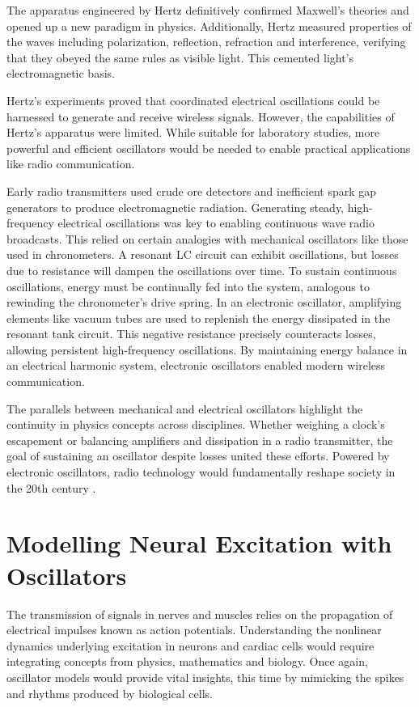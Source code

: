 The apparatus engineered by Hertz definitively confirmed Maxwell's theories and opened up a new paradigm in physics. Additionally, Hertz measured properties of the waves including polarization, reflection, refraction and interference, verifying that they obeyed the same rules as visible light. This cemented light's electromagnetic basis.

Hertz's experiments proved that coordinated electrical oscillations could be harnessed to generate and receive wireless signals. However, the capabilities of Hertz's apparatus were limited. While suitable for laboratory studies, more powerful and efficient oscillators would be needed to enable practical applications like radio communication.

Early radio transmitters used crude ore detectors and inefficient spark gap generators to produce electromagnetic radiation. Generating steady, high-frequency electrical oscillations was key to enabling continuous wave radio broadcasts. This relied on certain analogies with mechanical oscillators like those used in chronometers. A resonant LC circuit can exhibit oscillations, but losses due to resistance will dampen the oscillations over time. To sustain continuous oscillations, energy must be continually fed into the system, analogous to rewinding the chronometer's drive spring. In an electronic oscillator, amplifying elements like vacuum tubes are used to replenish the energy dissipated in the resonant tank circuit. This negative resistance precisely counteracts losses, allowing persistent high-frequency oscillations. By maintaining energy balance in an electrical harmonic system, electronic oscillators enabled modern wireless communication.

The parallels between mechanical and electrical oscillators highlight the continuity in physics concepts across disciplines. Whether weighing a clock's escapement or balancing amplifiers and dissipation in a radio transmitter, the goal of sustaining an oscillator despite losses united these efforts. Powered by electronic oscillators, radio technology would fundamentally reshape society in the 20th century \citep{Clarke2011}.

\section{Modelling Neural Excitation with Oscillators}

The transmission of signals in nerves and muscles relies on the propagation of electrical impulses known as action potentials. Understanding the nonlinear dynamics underlying excitation in neurons and cardiac cells would require integrating concepts from physics, mathematics and biology. Once again, oscillator models would provide vital insights, this time by mimicking the spikes and rhythms produced by biological cells.

